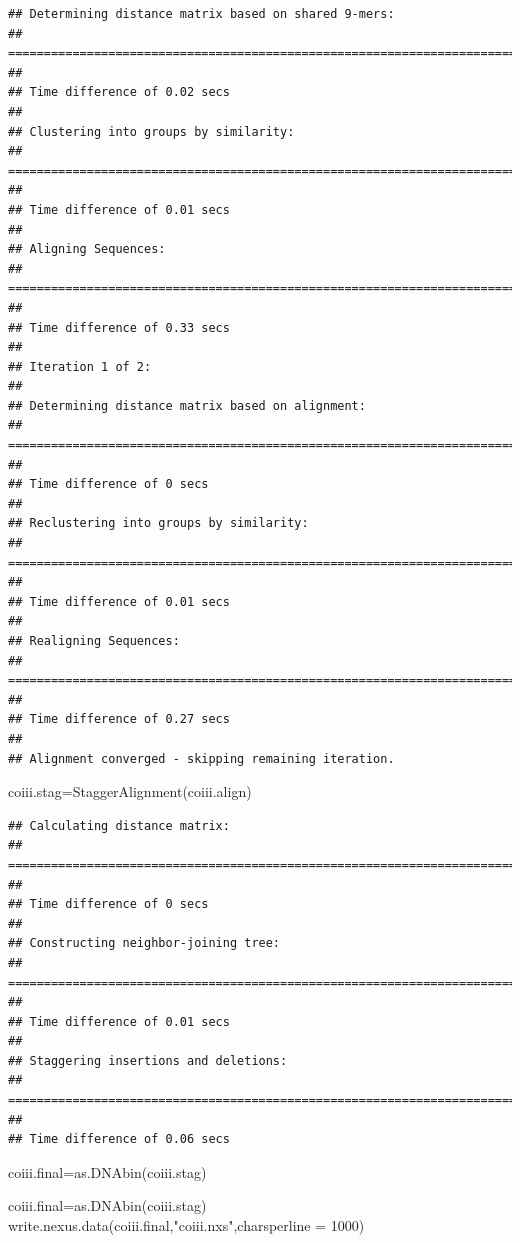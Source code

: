 \documentclass[
]{article}
\newenvironment{Shaded}{\begin{snugshade}}{\end{snugshade}}
\newcommand{\AttributeTok}[1]{\textcolor[rgb]{0.77,0.63,0.00}{#1}}
\newcommand{\DecValTok}[1]{\textcolor[rgb]{0.00,0.00,0.81}{#1}}
\newcommand{\FunctionTok}[1]{\textcolor[rgb]{0.00,0.00,0.00}{#1}}
\newcommand{\NormalTok}[1]{#1}
\newcommand{\OtherTok}[1]{\textcolor[rgb]{0.56,0.35,0.01}{#1}}
\newcommand{\StringTok}[1]{\textcolor[rgb]{0.31,0.60,0.02}{#1}}
\begin{document}
\begin{verbatim}
## Determining distance matrix based on shared 9-mers:
## ================================================================================
## 
## Time difference of 0.02 secs
## 
## Clustering into groups by similarity:
## ================================================================================
## 
## Time difference of 0.01 secs
## 
## Aligning Sequences:
## ================================================================================
## 
## Time difference of 0.33 secs
## 
## Iteration 1 of 2:
## 
## Determining distance matrix based on alignment:
## ================================================================================
## 
## Time difference of 0 secs
## 
## Reclustering into groups by similarity:
## ================================================================================
## 
## Time difference of 0.01 secs
## 
## Realigning Sequences:
## ================================================================================
## 
## Time difference of 0.27 secs
## 
## Alignment converged - skipping remaining iteration.
\end{verbatim}

\begin{Shaded}
\begin{Highlighting}[]
\NormalTok{coiii.stag}\OtherTok{=}\FunctionTok{StaggerAlignment}\NormalTok{(coiii.align)}
\end{Highlighting}
\end{Shaded}

\begin{verbatim}
## Calculating distance matrix:
## ================================================================================
## 
## Time difference of 0 secs
## 
## Constructing neighbor-joining tree:
## ================================================================================
## 
## Time difference of 0.01 secs
## 
## Staggering insertions and deletions:
## ================================================================================
## 
## Time difference of 0.06 secs
\end{verbatim}

\begin{Shaded}
\begin{Highlighting}[]
\NormalTok{coiii.final}\OtherTok{=}\FunctionTok{as.DNAbin}\NormalTok{(coiii.stag)}
\end{Highlighting}
\end{Shaded}

\begin{Shaded}
\begin{Highlighting}[]
\NormalTok{coiii.final}\OtherTok{=}\FunctionTok{as.DNAbin}\NormalTok{(coiii.stag)}
\FunctionTok{write.nexus.data}\NormalTok{(coiii.final,}\StringTok{"coiii.nxs"}\NormalTok{,}\AttributeTok{charsperline =} \DecValTok{1000}\NormalTok{)}
\end{Highlighting}
\end{Shaded}
\end{document}
